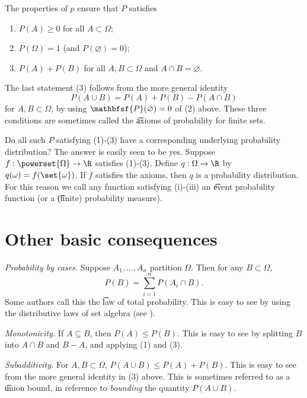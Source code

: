The properties of $p$ ensure that $P$ satisfies
    \begin{enumerate}
      \item $P(A) \geq 0$ for all $A \subset \Omega $;
      \item $P(\Omega ) = 1$ (and $P(\varnothing) = 0$);
      \item $P(A) + P(B)$ for all $A, B \subset \Omega $ and $A \cap  B = \varnothing$.
    \end{enumerate}
The last statement (3) follows from the more general identity
\[
P(A \cup B) = P(A) + P(B) - P(A \cap  B)
\]
for $A, B \subset \Omega $, by using $\mathbfsf{P} (\varnothing) = 0$ of (2) above.
These three conditions are sometimes called the \t{axioms of probability for finite sets}.

Do all such $P$ satisfying (1)-(3) have a corresponding underlying probability distribution?
The answer is easily seen to be yes.
Suppose $f: \powerset{\Omega } \to \R $ satisfies (1)-(3).
Define $q: \Omega  \to \R $ by $q(\omega ) = f(\set{\omega })$.
If $f$ satisfies the axioms, then $q$ is a probability distribution.
For this reason we call any function satisfying (i)-(iii) an \t{event probability function} (or a \t{(finite) probability measure}).

\section*{Other basic consequences}

\textit{Probability by cases.}
Suppose $A_1, \dots , A_n$ partition $\Omega $.
Then for any $B \subset \Omega $,
\[
\textstyle
P(B) = \sum_{i = 1}^{n} P(A_i \cap  B).
\]
Some authors call this the \t{law of total probability}.
This is easy to see by using the distributive laws of set algebra (see ).

\textit{Monotonicity.}
If $A \subseteq B$, then $P(A) \leq P(B)$.
This is easy to see by splitting $B$ into $A \cap  B$ and $B - A$, and applying (1) and (3).

\textit{Subadditivity.}
For $A, B \subset \Omega $, $P(A \cup B) \leq P(A) + P(B)$.
This is easy to see from the more general identity in (3) above.
This is sometimes referred to as a \t{union bound}, in reference to \textit{bounding} the quantity $P(A \cup B)$.
